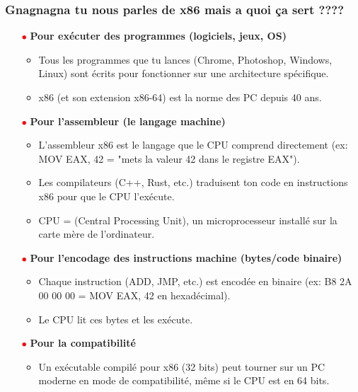 \documentclass{article}
\begin{document}
\subsubsection*{Gnagnagna tu nous parles de x86 mais a quoi ça sert ????}
\begin{figure}[h]
    \label{fig:x86}
\end{figure}
\begin{itemize}
    \item[\textbf{\textcolor{red}{$\bullet$}}] \textbf{Pour exécuter des programmes (logiciels, jeux, OS)}
    \begin{itemize}
        \item Tous les programmes que tu lances (Chrome, Photoshop, Windows, Linux) sont écrits pour fonctionner sur une architecture spécifique.
        \item x86 (et son extension x86-64) est la norme des PC depuis 40 ans.
    \end{itemize}
    
    \item[\textbf{\textcolor{red}{$\bullet$}}] \textbf{Pour l'assembleur (le langage machine)}
    \begin{itemize}
        \item L'assembleur x86 est le langage que le CPU comprend directement (ex: MOV EAX, 42 = "mets la valeur 42 dans le registre EAX").
        \item Les compilateurs (C++, Rust, etc.) traduisent ton code en instructions x86 pour que le CPU l'exécute.
        \item CPU = (Central Processing Unit), un microprocesseur installé sur la carte mère de l'ordinateur.
    \end{itemize}
    
    \item[\textbf{\textcolor{red}{$\bullet$}}] \textbf{Pour l'encodage des instructions machine (bytes/code binaire)}
    \begin{itemize}
        \item Chaque instruction (ADD, JMP, etc.) est encodée en binaire (ex: B8 2A 00 00 00 = MOV EAX, 42 en hexadécimal).
        \item Le CPU lit ces bytes et les exécute.
    \end{itemize}
    
    \item[\textbf{\textcolor{red}{$\bullet$}}] \textbf{Pour la compatibilité}
    \begin{itemize}
        \item Un exécutable compilé pour x86 (32 bits) peut tourner sur un PC moderne en mode de compatibilité, même si le CPU est en 64 bits.
    \end{itemize}
\end{itemize}
\end{document}
